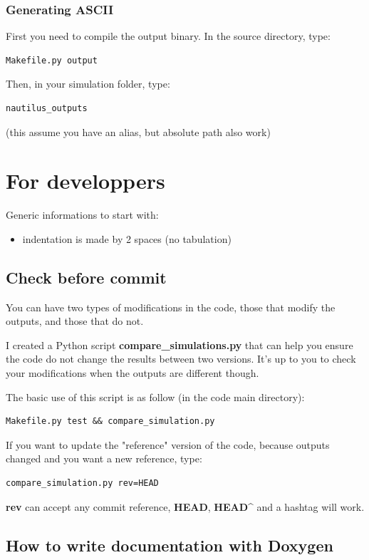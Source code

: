 \documentclass[english,a4paper,twoside]{article}
\begin{document}
\subsubsection{Generating ASCII}
First you need to compile the output binary. In the source directory, type:
\begin{verbatim}
Makefile.py output
\end{verbatim}

Then, in your simulation folder, type:
\begin{verbatim}
nautilus_outputs
\end{verbatim}
(this assume you have an alias, but absolute path also work)

\section{For developpers}
Generic informations to start with:
\begin{itemize}
\item indentation is made by 2 spaces (no tabulation)
\end{itemize}

\subsection{Check before commit}\label{sec:compare_simulation}
You can have two types of modifications in the code, those that modify the outputs, and those that do not.

I created a Python script \textbf{compare\_simulations.py} that can help you ensure the code do not change the results between two versions. It's up to you to check your modifications when the outputs are different though.

\bigskip

The basic use of this script is as follow (in the code main directory):
\begin{verbatim}
Makefile.py test && compare_simulation.py
\end{verbatim}

\bigskip

If you want to update the "reference" version of the code, because outputs changed and you want a new reference, type:
\begin{verbatim}
compare_simulation.py rev=HEAD
\end{verbatim}
\textbf{rev} can accept any commit reference, \textbf{HEAD}, \textbf{HEAD\^} and a hashtag will work.

\subsection{How to write documentation with Doxygen}
\end{document}
